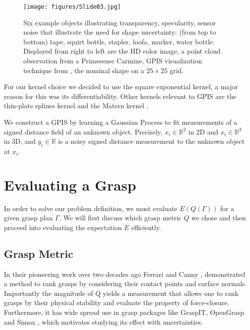 \documentclass[letterpaper, 10 pt, conference]{ieeeconf}  %
\begin{document}
\begin{figure}[ht!]
\centering
\texttt{[image: figures/Slide03.jpg]}
\caption{\footnotesize Six example objects illustrating transparency, specularity, sensor noise that illustrate the need for shape uncertainty: (from top to bottom) tape, squirt bottle, stapler, loofa, marker, water bottle. Displayed from right to left are the HD color image, a point cloud observation from a Primesense Carmine, GPIS visualization technique from \cite{jeffs}, the nominal shape on a $25 \times 25$ grid.  }
\vspace*{-10pt}
\label{fig:GPIS_TSDF}
\end{figure}

For our kernel choice we decided to use the square exponential kernel, a major reason for this was its differentiability. Other kernels relevant to GPIS are the thin-plate splines kernel and the Matern kernel \cite{williams2007}. 

We construct a GPIS by learning a Gaussian Process to fit measurements of a signed distance field of an unknown object.  Precisely, $x_i \in \mathbb{R}^2$ in 2D and $x_i \in \mathbb{R}^3$ in 3D, and $y_i \in \mathbb{R}$ is a noisy signed distance measurement to the unknown object at $x_i$.







\section{Evaluating a Grasp}
 In order to solve our problem definition, we must evaluate $E(Q(\Gamma))$ for a given grasp plan $\Gamma$. We will first discuss which grasp metric $Q$ we chose and then proceed into evaluating the expectation $E$ efficiently. 

\subsection{Grasp Metric}
In their pioneering work over two decades ago Ferrari and Canny \cite{ferrari1992}, demonstrated a method to rank grasps by considering their contact points and surface normals. Importantly the magnitude of Q yields a measurement that allows one to rank grasps by their physical stability and evaluate the property of force-closure. Furthermore, it has wide spread use in grasp packages like GraspIT\cite{miller2004graspit}, OpenGrasp\cite{73} and Simox \cite{vahrenkamp2010simo}, which motivates studying its effect with uncertainties. 
\end{document}

